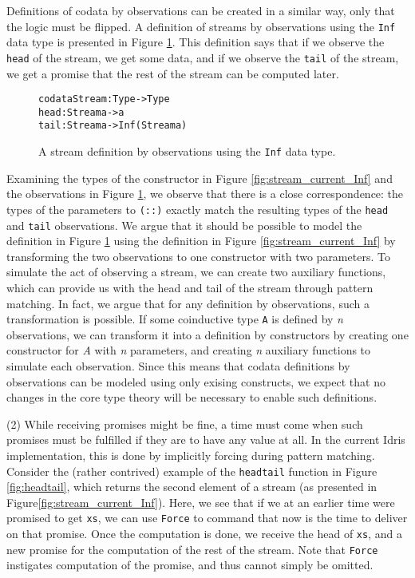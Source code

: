 Definitions of codata by observations can be created in a similar way, only that the logic must be flipped. A definition of streams by observations using the \texttt{Inf} data type is presented in Figure \ref{fig:stream_copatterns_Inf}. This definition says that if we observe the \texttt{head} of the stream, we get some data, and if we observe the \texttt{tail} of the stream, we get a promise that the rest of the stream can be computed later.

\begin{figure}
\begin{alltt}
codata Stream : Type -> Type
  head : Stream a -> a
  tail : Stream a -> Inf (Stream a)
\end{alltt}
\caption{A stream definition by observations using the \texttt{Inf} data type.}
\label{fig:stream_copatterns_Inf}
\end{figure}

Examining the types of the constructor in Figure \ref{fig:stream_current_Inf} and the observations in Figure \ref{fig:stream_copatterns_Inf}, we observe that there is a close correspondence: the types of the parameters to \texttt{(::)} exactly match the resulting types of the \texttt{head} and \texttt{tail} observations. We argue that it should be possible to model the definition in Figure \ref{fig:stream_copatterns_Inf} using the definition in Figure \ref{fig:stream_current_Inf} by transforming the two observations to one constructor with two parameters. To simulate the act of observing a stream, we can create two auxiliary functions, which can provide us with the head and tail of the stream through pattern matching. In fact, we argue that for any definition by observations, such a transformation is possible. If some coinductive type \texttt{A} is defined by \emph{n} observations, we can transform it into a definition by constructors by creating one constructor for \emph{A} with \emph{n} parameters, and creating \emph{n} auxiliary functions to simulate each observation. Since this means that codata definitions by observations can be modeled using only exising constructs, we expect that no changes in the core type theory will be necessary to enable such definitions.

(2) While receiving promises might be fine, a time must come when such promises must be fulfilled if they are to have any value at all. In the current Idris implementation, this is done by implicitly forcing during pattern matching. Consider the (rather contrived) example of the \texttt{headtail} function in Figure \ref{fig:headtail}, which returns the second element of a stream (as presented in Figure\ref{fig:stream_current_Inf}). Here, we see that if we at an earlier time were promised to get \texttt{xs}, we can use \texttt{Force} to command that now is the time to deliver on that promise. Once the computation is done, we receive the head of \texttt{xs}, and a new promise for the computation of the rest of the stream. Note that \texttt{Force} instigates computation of the promise, and thus cannot simply be omitted.

